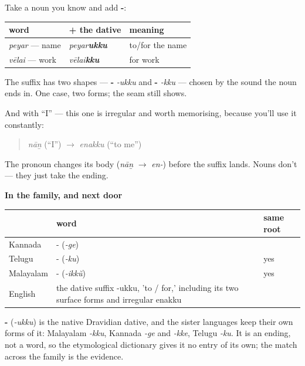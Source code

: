 \begin{grammarlens}[title={Grammar Lens: Adding it on}]
Take a noun you know and add \textbf{-}:

\noindent
\begin{tabularx}{\linewidth}{@{}>{\raggedright\arraybackslash}X>{\raggedright\arraybackslash}X>{\raggedright\arraybackslash}X@{}}
\toprule
\textbf{word} & \textbf{+ the dative} & \textbf{meaning} \\
\midrule
\emph{peyar} — name & \emph{peyar\textbf{ukku}} & to/for the name \\
\emph{vēlai} — work & \emph{vēlai\textbf{kku}} & for work \\
\bottomrule
\end{tabularx}

The suffix has two shapes — \textbf{-} \emph{-ukku} and \textbf{-} \emph{-kku} — chosen by the sound the noun ends in. One case, two forms; the seam still shows.

And with \textquotedblleft{}I\textquotedblright{} — this one is irregular and worth memorising, because you'll use it constantly:

\begin{quote}
\emph{nāṉ} (\textquotedblleft{}I\textquotedblright{}) $\to$ \emph{enakku} (\textquotedblleft{}to me\textquotedblright{})
\end{quote}

The pronoun changes its body (\emph{nāṉ} $\to$ \emph{en-}) before the suffix lands. Nouns don't — they just take the ending.

\textbf{In the family, and next door}

\noindent
\begin{tabularx}{\linewidth}{@{}>{\raggedright\arraybackslash}X>{\raggedright\arraybackslash}X>{\raggedright\arraybackslash}X@{}}
\toprule
\textbf{} & \textbf{word} & \textbf{same root} \\
\midrule
Kannada & -\ka{ಗೆ} (\emph{-ge}) &  \\
Telugu & -\te{కు} (\emph{-ku}) & yes \\
Malayalam & -\ml{ിക്ക്} (\emph{-ikkŭ}) & yes \\
English & the dative suffix -ukku, 'to / for,' including its two surface forms and irregular enakku &  \\
\bottomrule
\end{tabularx}
\end{grammarlens}

\begin{cousinweb}
\textbf{-} (\emph{-ukku}) is the native Dravidian dative, and the sister languages keep their own forms of it: Malayalam \emph{-kku}, Kannada \emph{-ge} and \emph{-kke}, Telugu \emph{-ku}. It is an ending, not a word, so the etymological dictionary gives it no entry of its own; the match across the family is the evidence.
\end{cousinweb}

